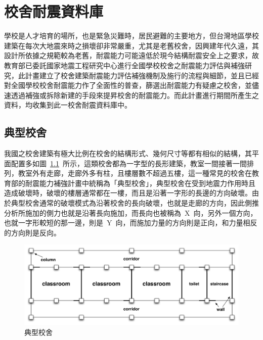 \renewcommand\thetable{\arabic{chapter}-\arabic{table}}
\renewcommand{\theequation}{\arabic{chapter}-\arabic{equation}}
\chapter{校舍耐震資料庫}

學校是人才培育的場所，也是緊急災難時，居民避難的主要地方，但台灣地區學校建築在每次大地震來時之損壞卻非常嚴重，尤其是老舊校舍，因興建年代久遠，其設計所依據之規範較為老舊，耐震能力可能遠低於現今結構耐震安全上之要求，故教育部已委託國家地震工程研究中心進行全國學校校舍之耐震能力評估與補強研究，此計畫建立了校舍建築耐震能力評估補強機制及施行的流程與細節，並且已經對全國學校校舍耐震能力作了全面性的普查，篩選出耐震能力有疑慮之校舍，並儘速透過補強或拆除新建的手段來提昇校舍的耐震能力。而此計畫進行期間所產生之資料，均收集到此一校舍耐震資料庫中。

\section{典型校舍}

我國之校舍建築有極大比例在校舍的結構形式、幾何尺寸等都有相似的結構，其平面配置多如圖~\ref{fig:TSB}~所示，這類校舍都為一字型的長形建築，教室一間接著一間排列，教室外有走廊，走廊外多有柱，且樓層數不超過五樓，這一種常見的校舍在教育部的耐震能力補強計畫中統稱為「典型校舍」，典型校舍在受到地震力作用時且造成破壞時，破壞的樓層通常都在一樓，而且是沿著一字形的長邊的方向破壞。由於典型校舍通常的破壞模式為沿著校舍的長向破壞，也就是走廊的方向，因此側推分析所施加的側力也就是沿著長向施加，而長向也被稱為~X~向，另外一個方向，也就一字形較短的那一邊，則是~Y~向，而施加力量的方向則是正向，和力量相反的方向則是反向。

\begin{figure}[hbtp]
  \begin{center}
    \includegraphics[width=1.0\textwidth]{figures/trad-school-building.pdf}
    \caption{典型校舍} 
    \label{fig:TSB}
  \end{center}
\end{figure}

